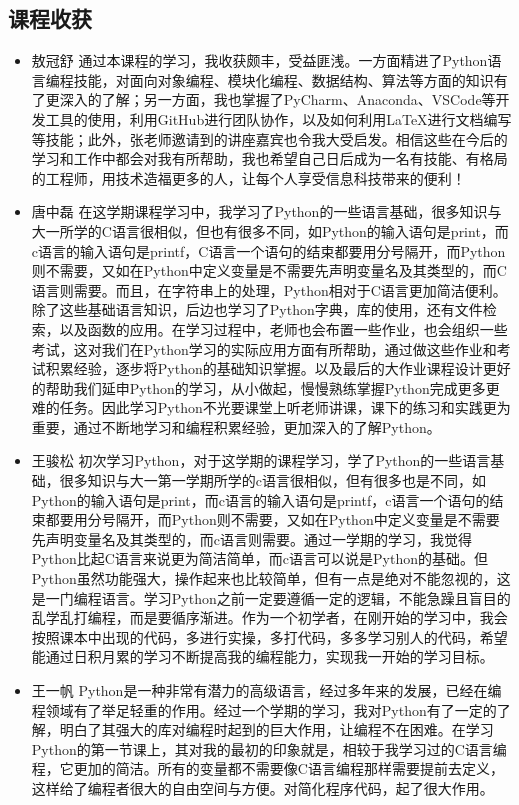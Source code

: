 \documentclass[UTF8,AutoFakeBold,AutoFakeSlant,zihao=-4]{ctexart}
\begin{document}
\subsection{课程收获}
\begin{itemize}
  \item 敖冠舒
  \subitem 通过本课程的学习，我收获颇丰，受益匪浅。一方面精进了Python语言编程技能，对面向对象编程、模块化编程、数据结构、算法等方面的知识有了更深入的了解；另一方面，我也掌握了PyCharm、Anaconda、VSCode等开发工具的使用，利用GitHub进行团队协作，以及如何利用LaTeX进行文档编写等技能；此外，张老师邀请到的讲座嘉宾也令我大受启发。相信这些在今后的学习和工作中都会对我有所帮助，我也希望自己日后成为一名有技能、有格局的工程师，用技术造福更多的人，让每个人享受信息科技带来的便利！
  \item 唐中磊
  \subitem 在这学期课程学习中，我学习了Python的一些语言基础，很多知识与大一所学的C语言很相似，但也有很多不同，如Python的输入语句是print，而c语言的输入语句是printf，C语言一个语句的结束都要用分号隔开，而Python则不需要，又如在Python中定义变量是不需要先声明变量名及其类型的，而C语言则需要。而且，在字符串上的处理，Python相对于C语言更加简洁便利。除了这些基础语言知识，后边也学习了Python字典，库的使用，还有文件检索，以及函数的应用。在学习过程中，老师也会布置一些作业，也会组织一些考试，这对我们在Python学习的实际应用方面有所帮助，通过做这些作业和考试积累经验，逐步将Python的基础知识掌握。以及最后的大作业课程设计更好的帮助我们延申Python的学习，从小做起，慢慢熟练掌握Python完成更多更难的任务。因此学习Python不光要课堂上听老师讲课，课下的练习和实践更为重要，通过不断地学习和编程积累经验，更加深入的了解Python。
  \item 王骏松
  \subitem 初次学习Python，对于这学期的课程学习，学了Python的一些语言基础，很多知识与大一第一学期所学的c语言很相似，但有很多也是不同，如Python的输入语句是print，而c语言的输入语句是printf，c语言一个语句的结束都要用分号隔开，而Python则不需要，又如在Python中定义变量是不需要先声明变量名及其类型的，而c语言则需要。通过一学期的学习，我觉得Python比起C语言来说更为简洁简单，而c语言可以说是Python的基础。但Python虽然功能强大，操作起来也比较简单，但有一点是绝对不能忽视的，这是一门编程语言。学习Python之前一定要遵循一定的逻辑，不能急躁且盲目的乱学乱打编程，而是要循序渐进。作为一个初学者，在刚开始的学习中，我会按照课本中出现的代码，多进行实操，多打代码，多多学习别人的代码，希望能通过日积月累的学习不断提高我的编程能力，实现我一开始的学习目标。
  \item 王一帆
  \subitem Python是一种非常有潜力的高级语言，经过多年来的发展，已经在编程领域有了举足轻重的作用。经过一个学期的学习，我对Python有了一定的了解，明白了其强大的库对编程时起到的巨大作用，让编程不在困难。在学习Python的第一节课上，其对我的最初的印象就是，相较于我学习过的C语言编程，它更加的简洁。所有的变量都不需要像C语言编程那样需要提前去定义，这样给了编程者很大的自由空间与方便。对简化程序代码，起了很大作用。
\end{itemize}
\end{document}
